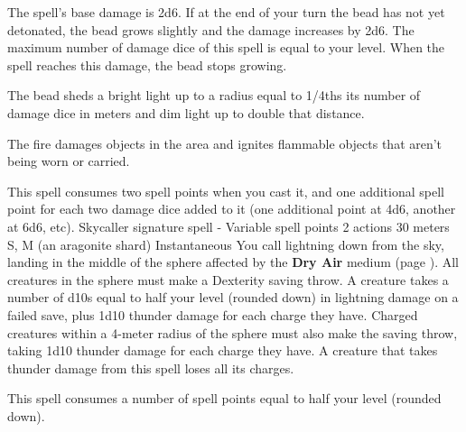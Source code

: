     The spell's base damage is 2d6.
    If at the end of your turn the bead has not yet detonated, the bead grows slightly and the damage increases by 2d6.
    The maximum number of damage dice of this spell is equal to your level.
    When the spell reaches this damage, the bead stops growing.

    The bead sheds a bright light up to a radius equal to 1/4ths its number of damage dice in meters and dim light up to double that distance.

    The fire damages objects in the area and ignites flammable objects that aren't being worn or carried.

    This spell consumes two spell points when you cast it, and one additional spell point for each two damage dice added to it (one additional point at 4d6, another at 6d6, etc).
    {Skycaller signature spell - Variable spell points}
    {2 actions}
    {30 meters}
    {S, M (an aragonite shard)}
    {Instantaneous}
    You call lightning down from the sky, landing in the middle of the sphere affected by the \textbf{Dry Air} medium (page \pageref{medium::dryair}).
    All creatures in the sphere must make a Dexterity saving throw.
    A creature takes a number of d10s equal to half your level (rounded down) in lightning damage on a failed save, plus 1d10 thunder damage for each charge they have.
    Charged creatures within a 4-meter radius of the sphere must also make the saving throw, taking 1d10 thunder damage for each charge they have.
    A creature that takes thunder damage from this spell loses all its charges.

    This spell consumes a number of spell points equal to half your level (rounded down).

